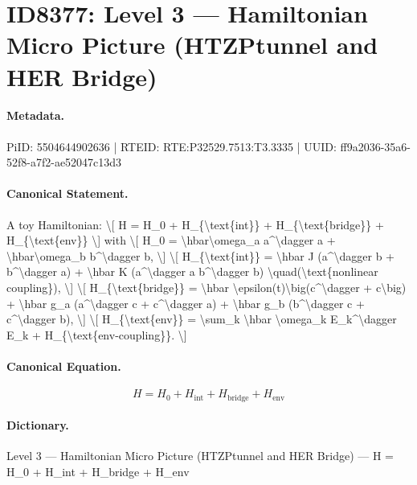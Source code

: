 \section*{ID8377: Level 3 — Hamiltonian Micro Picture (HTZPtunnel and HER Bridge)}
\paragraph{Metadata.}
PiID: 5504644902636 | RTEID: RTE:P32529.7513:T3.3335 | UUID: ff9a2036-35a6-52f8-a7f2-ae52047c13d3

\paragraph{Canonical Statement.}
A toy Hamiltonian: \textbackslash{}[ H = H\_0 + H\_\{\textbackslash{}text\{int\}\} + H\_\{\textbackslash{}text\{bridge\}\} + H\_\{\textbackslash{}text\{env\}\} \textbackslash{}] with \textbackslash{}[ H\_0 = \textbackslash{}hbar\textbackslash{}omega\_a a\textasciicircum{}\textbackslash{}dagger a + \textbackslash{}hbar\textbackslash{}omega\_b b\textasciicircum{}\textbackslash{}dagger b, \textbackslash{}] \textbackslash{}[ H\_\{\textbackslash{}text\{int\}\} = \textbackslash{}hbar J (a\textasciicircum{}\textbackslash{}dagger b + b\textasciicircum{}\textbackslash{}dagger a) + \textbackslash{}hbar K (a\textasciicircum{}\textbackslash{}dagger a b\textasciicircum{}\textbackslash{}dagger b) \textbackslash{}quad(\textbackslash{}text\{nonlinear coupling\}), \textbackslash{}] \textbackslash{}[ H\_\{\textbackslash{}text\{bridge\}\} = \textbackslash{}hbar \textbackslash{}epsilon(t)\textbackslash{}big(c\textasciicircum{}\textbackslash{}dagger + c\textbackslash{}big) + \textbackslash{}hbar g\_a (a\textasciicircum{}\textbackslash{}dagger c + c\textasciicircum{}\textbackslash{}dagger a) + \textbackslash{}hbar g\_b (b\textasciicircum{}\textbackslash{}dagger c + c\textasciicircum{}\textbackslash{}dagger b), \textbackslash{}] \textbackslash{}[ H\_\{\textbackslash{}text\{env\}\} = \textbackslash{}sum\_k \textbackslash{}hbar \textbackslash{}omega\_k E\_k\textasciicircum{}\textbackslash{}dagger E\_k + H\_\{\textbackslash{}text\{env-coupling\}\}. \textbackslash{}]

\paragraph{Canonical Equation.}
\[
H = H_0 + H_{\text{int}} + H_{\text{bridge}} + H_{\text{env}}
\]

\paragraph{Dictionary.}
Level 3 — Hamiltonian Micro Picture (HTZPtunnel and HER Bridge) — H = H\_0 + H\_int + H\_bridge + H\_env

